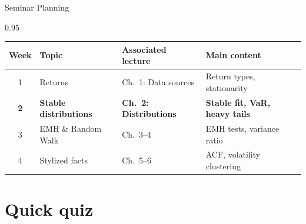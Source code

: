 \documentclass[9pt, aspectratio=169, t]{beamer}
\begin{document}
\begin{frame}{Seminar Planning}
    \begin{cminipage}{0.95\textwidth}
\renewcommand{\arraystretch}{1.3}
\begin{center}
\begin{tabular}{clll}
\toprule
\textbf{Week} & \textbf{Topic} & \textbf{Associated lecture} & \textbf{Main content} \\
\midrule
1 & Returns & Ch.\ 1: Data sources & Return types, stationarity \\
\rowcolor{MainBlue!10}
\textbf{2} & \textbf{Stable distributions} & \textbf{Ch.\ 2: Distributions} & \textbf{Stable fit, VaR, heavy tails} \\
3 & EMH \& Random Walk & Ch.\ 3--4 & EMH tests, variance ratio \\
4 & Stylized facts & Ch.\ 5--6 & ACF, volatility clustering \\
\bottomrule
\end{tabular}
\end{center}
    \end{cminipage}
\end{frame}

\section{Quick quiz}
\end{document}
